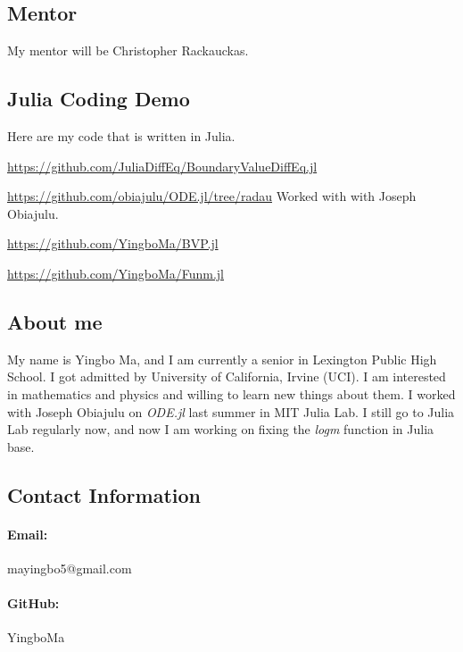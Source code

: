 \documentclass[a4paper,12pt,onecolumn]{article}
\begin{document}
\subsection{Mentor} %
\label{sub:mentor}
My mentor will be Christopher Rackauckas.



\subsection{Julia Coding Demo} %
\label{ssub:julia_coding_demo}
Here are my code that is written in Julia.

\url{https://github.com/JuliaDiffEq/BoundaryValueDiffEq.jl}

\url{https://github.com/obiajulu/ODE.jl/tree/radau} Worked with with Joseph Obiajulu.

\url{https://github.com/YingboMa/BVP.jl}

\url{https://github.com/YingboMa/Funm.jl}

\subsection{About me} %
\label{ssub:about_me}
My name is Yingbo Ma, and I am currently a senior in Lexington Public High School. I got admitted by
University of California, Irvine (UCI). I am interested in mathematics and physics and willing to
learn new things about them. I worked with Joseph Obiajulu on \textit{ODE.jl} last summer in MIT
Julia Lab. I still go to Julia Lab regularly now, and now I am working on fixing the \textit{logm}
function in Julia base.

\subsection{Contact Information} %
\label{ssub:contact_information}
\paragraph{Email:} mayingbo5@gmail.com

\paragraph{GitHub:} YingboMa
\end{document}
